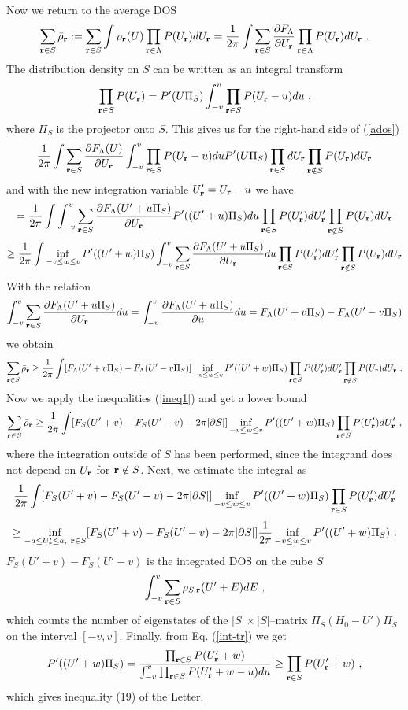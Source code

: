 \documentclass[aps]{revtex4}
\def\beq{\begin{equation}}
\def\eeq{\end{equation}}
\def\br{{\bf r}}
\begin{document}
Now we return to the average DOS
\beq
\sum_{\br\in S}{\bar \rho}_\br
:=\sum_{\br\in S}\int\rho_\br(U) \prod_{\br\in \Lambda}P(U_\br)dU_\br
=\frac{1}{2\pi}\int\sum_{\br\in S}\frac{\partial F_\Lambda}{\partial U_\br} 
\prod_{\br\in \Lambda}P(U_\br)dU_\br
\ .
\label{ados}
\eeq
The distribution density on $S$ can be written as an integral transform
\beq
\prod_{\br\in S}P(U_\br)
=P'(U\Pi_S)\int_{-v}^v \prod_{\br\in S}P(U_\br-u)du
\ ,
\label{int-tr}
\eeq
where $\Pi_S$ is the projector onto $S$.
This gives us for the right-hand side of (\ref{ados})
\[
\frac{1}{2\pi}\int\sum_{\br\in S}\frac{\partial F_\Lambda(U)}{\partial U_\br} 
\int_{-v}^v\prod_{\br\in S}P(U_\br-u)duP'(U\Pi_S)\prod_{\br\in S}dU_\br \prod_{\br\notin S}P(U_\br)dU_\br
\]
and with the new integration variable $U_\br'=U_\br-u$ we have
\[
=\frac{1}{2\pi}\int\int_{-v}^v\sum_{\br\in S}\frac{\partial F_\Lambda(U'+u\Pi_S)}{\partial U_\br}
P'((U'+u)\Pi_S)du 
\prod_{\br\in S}P(U_\br')dU_\br'\prod_{\br\notin S}P(U_\br)dU_\br
\]
\beq
\ge \frac{1}{2\pi}\int\inf_{-v\le w\le v}P'((U'+w)\Pi_S)
\int_{-v}^v\sum_{\br\in S}\frac{\partial F_\Lambda(U'+u\Pi_S)}{\partial U_\br}du 
\prod_{\br\in S}P(U_\br')dU_\br'\prod_{\br\notin S}P(U_\br)dU_\br
\eeq
With the relation
\[
\int_{-v}^v\sum_{\br\in S}\frac{\partial F_\Lambda(U'+u\Pi_S)}{\partial U_\br}du
=\int_{-v}^v\frac{\partial F_\Lambda(U'+u\Pi_S)}{\partial u}du
=F_\Lambda(U'+v\Pi_S)-F_\Lambda(U'-v\Pi_S)
\]
we obtain
\beq
\sum_{\br\in S}{\bar \rho}_\br
\ge\frac{1}{2\pi}\int [F_\Lambda(U'+v\Pi_S)-F_\Lambda(U'-v\Pi_S)]
\inf_{-v\le w\le v}P'((U'+w)\Pi_S)\prod_{\br\in S}P(U_\br')dU_\br'\prod_{\br\notin S}P(U_\br)dU_\br
\ .
\eeq
Now we apply the inequalities (\ref{ineq1}) and get a lower bound
\beq
\sum_{\br\in S}{\bar \rho}_\br
\ge\frac{1}{2\pi}\int [F_S(U'+v)-F_S(U'-v)-2\pi|\partial S|]\inf_{-v\le w\le v}P'((U'+w)\Pi_S)
\prod_{\br\in S}P(U_\br')dU_\br'
\ ,
\eeq
where the integration outside of $S$ has been performed, since the integrand
does not depend on $U_\br$ for $\br\notin S$. Next, we estimate the integral as
\[
\frac{1}{2\pi}\int [F_S(U'+v)-F_S(U'-v)-2\pi|\partial S|]\inf_{-v\le w\le v}P'((U'+w)\Pi_S)
\prod_{\br\in S}P(U_\br')dU_\br'
\]
\beq
\ge 
\inf_{-a\le U_\br'\le a,\ \br\in S}[F_S(U'+v)-F_S(U'-v)-2\pi|\partial S|]
\frac{1}{2\pi}\inf_{-v\le w\le v}P'((U'+w)\Pi_S) 
\ .
\eeq
$F_S(U'+v)-F_S(U'-v)$ is the integrated DOS on the cube $S$
\[
\int_{-v}^v\sum_{\br \in S}\rho_{S,\br}(U'+E)dE
\ ,
\]
which counts the number of eigenstates of the $|S|\times|S|$--matrix
$\Pi_S(H_0-U')\Pi_S$ on the interval $[-v,v]$. Finally, from Eq. (\ref{int-tr}) we get
\beq
P'((U'+w)\Pi_S)=\frac{\prod_{\br\in S}P(U_\br'+w)}{\int_{-v}^v\prod_{\br\in S}P(U_\br'+w-u)du}
\ge \prod_{\br\in S}P(U_\br'+w)
\ ,
\label{fin_in}
\eeq
which gives inequality (19) of the Letter.
\end{document}
